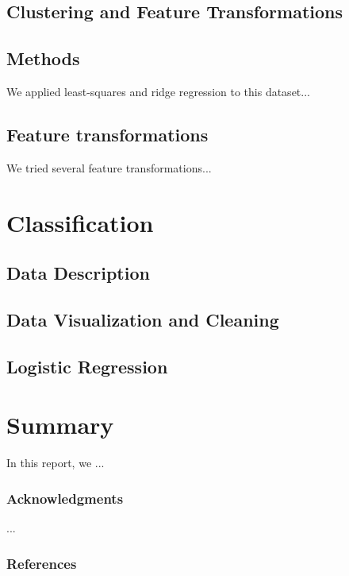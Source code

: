 \documentclass{article} %
\begin{document}

\subsection{Clustering and Feature Transformations}

\subsection{Methods}
We applied least-squares and ridge regression to this dataset...

\subsection{Feature transformations}
We tried several feature transformations...

\section{Classification}
\subsection{Data Description}
\subsection{Data Visualization and Cleaning}
\subsection{Logistic Regression}


\section{Summary}
In this report, we ...


\subsubsection*{Acknowledgments}
...

\subsubsection*{References}
\end{document}
